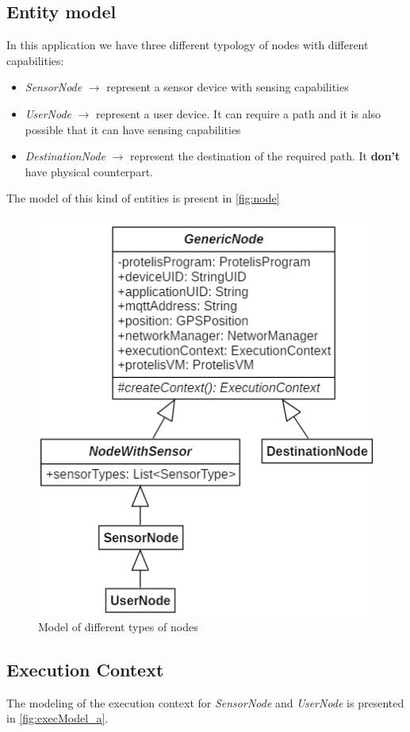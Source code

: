 \subsection{Entity model}
In this application we have three different typology of nodes with different capabilities:
\begin{itemize}
    \item \textit{SensorNode} $\rightarrow$ represent a sensor device with sensing capabilities
    \item \textit{UserNode} $\rightarrow$ represent a user device. It can require a path and it is also possible that it can have sensing capabilities
    \item \textit{DestinationNode} $\rightarrow$ represent the destination of the required path. It \textbf{don't} have physical counterpart.
\end{itemize}
The model of this kind of entities is present in \autoref{fig:node}
\begin{figure}[h]
    \centering
    \includegraphics[scale=0.9]{images/nodeModel.png}
    \caption{Model of different types of nodes}
    \label{fig:node}
\end{figure}

\subsection{Execution Context}
The modeling of the execution context for \textit{SensorNode} and \textit{UserNode} is presented in \autoref{fig:execModel_a}.

